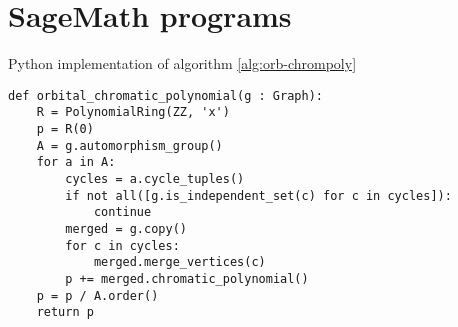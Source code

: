 \section{SageMath programs}

\begin{listing}[H]
\caption{Python implementation of algorithm \ref{alg:orb-chrompoly}}
\begin{lstlisting}
def orbital_chromatic_polynomial(g : Graph):  
    R = PolynomialRing(ZZ, 'x')
    p = R(0)
    A = g.automorphism_group()
    for a in A:
        cycles = a.cycle_tuples()
        if not all([g.is_independent_set(c) for c in cycles]):
            continue
        merged = g.copy()
        for c in cycles:
            merged.merge_vertices(c)
        p += merged.chromatic_polynomial()
    p = p / A.order()
    return p
\end{lstlisting}
\label{prg:orb-chrompoly}
\end{listing}